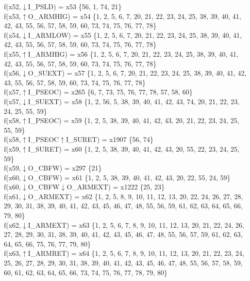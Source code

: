 f(x52,$\downarrow$I\_PSLD) = x53 \{56, 1, 74, 21\} \\  
f(x53,$\uparrow$O\_ARMHIG) = x54 \{1, 2, 5, 6, 7, 20, 21, 22, 23, 24, 25, 38, 39, 40, 41, 42, 43, 55, 56, 57, 58, 59, 60, 73, 74, 75, 76, 77, 78\} \\  
f(x54,$\downarrow$I\_ARMLOW) = x55 \{1, 2, 5, 6, 7, 20, 21, 22, 23, 24, 25, 38, 39, 40, 41, 42, 43, 55, 56, 57, 58, 59, 60, 73, 74, 75, 76, 77, 78\} \\  
f(x55,$\uparrow$I\_ARMHIG) = x56 \{1, 2, 5, 6, 7, 20, 21, 22, 23, 24, 25, 38, 39, 40, 41, 42, 43, 55, 56, 57, 58, 59, 60, 73, 74, 75, 76, 77, 78\} \\  
f(x56,$\downarrow$O\_SUEXT) = x57 \{1, 2, 5, 6, 7, 20, 21, 22, 23, 24, 25, 38, 39, 40, 41, 42, 43, 55, 56, 57, 58, 59, 60, 73, 74, 75, 76, 77, 78\} \\  
f(x57,$\uparrow$I\_PSEOC) = x265 \{6, 7, 73, 75, 76, 77, 78, 57, 58, 60\} \\  
f(x57,$\downarrow$I\_SUEXT) = x58 \{1, 2, 56, 5, 38, 39, 40, 41, 42, 43, 74, 20, 21, 22, 23, 24, 25, 55, 59\} \\  
f(x58,$\uparrow$I\_PSEOC) = x59 \{1, 2, 5, 38, 39, 40, 41, 42, 43, 20, 21, 22, 23, 24, 25, 55, 59\} \\  
f(x58,$\uparrow$I\_PSEOC$\uparrow$I\_SURET) = x1907 \{56, 74\} \\  
f(x59,$\uparrow$I\_SURET) = x60 \{1, 2, 5, 38, 39, 40, 41, 42, 43, 20, 55, 22, 23, 24, 25, 59\} \\  
f(x59,$\downarrow$O\_CBFW) = x297 \{21\} \\  
f(x60,$\downarrow$O\_CBFW) = x61 \{1, 2, 5, 38, 39, 40, 41, 42, 43, 20, 22, 55, 24, 59\} \\  
f(x60,$\downarrow$O\_CBFW$\downarrow$O\_ARMEXT) = x1222 \{25, 23\} \\  
f(x61,$\downarrow$O\_ARMEXT) = x62 \{1, 2, 5, 8, 9, 10, 11, 12, 13, 20, 22, 24, 26, 27, 28, 29, 30, 31, 38, 39, 40, 41, 42, 43, 45, 46, 47, 48, 55, 56, 59, 61, 62, 63, 64, 65, 66, 79, 80\} \\  
f(x62,$\downarrow$I\_ARMEXT) = x63 \{1, 2, 5, 6, 7, 8, 9, 10, 11, 12, 13, 20, 21, 22, 24, 26, 27, 28, 29, 30, 31, 38, 39, 40, 41, 42, 43, 45, 46, 47, 48, 55, 56, 57, 59, 61, 62, 63, 64, 65, 66, 75, 76, 77, 79, 80\} \\  
f(x63,$\uparrow$I\_ARMRET) = x64 \{1, 2, 5, 6, 7, 8, 9, 10, 11, 12, 13, 20, 21, 22, 23, 24, 25, 26, 27, 28, 29, 30, 31, 38, 39, 40, 41, 42, 43, 45, 46, 47, 48, 55, 56, 57, 58, 59, 60, 61, 62, 63, 64, 65, 66, 73, 74, 75, 76, 77, 78, 79, 80\} \\  
